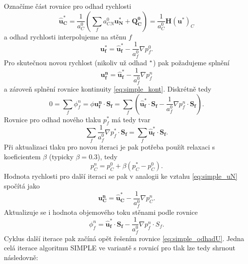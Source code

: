 Označíme část rovnice pro odhad rychlosti
\begin{equation}
\mathbf{\widehat{u}^*_C}= \dfrac{1}{a_C^0} (\sum_f a_{CN}^0 \mathbf{u_N^*}+\mathbf{Q_C^0}) =\dfrac{1}{a_C^0} \mathbf{H}(\mathbf{u^*})_C
\end{equation}
a odhad rychlosti interpolujeme na stěnu $ f $
\begin{equation}
 \mathbf{u_f^*}=\mathbf{\widehat{u}^*_f}-\dfrac{1}{a_f^0}\nabla p_f^0.
\end{equation}
Pro skutečnou novou rychlost (nikoliv už odhad $ \null^* $) pak požadujeme splnění
\begin{equation}\label{eq:simple_uN}
\mathbf{u_f^n}=\mathbf{\widehat{u}^*_f}-\dfrac{1}{a_f^0}\nabla p_f^n
\end{equation}
a zároveň splnění rovnice kontinuity \ref{eq:simple_kont}. Diskrétně tedy
\begin{equation}
0=\sum_f \phi_f^n = \phi \mathbf{u_f^n}\cdot \mathbf{S_f}
=
\sum_f \left(\mathbf{\widehat{u}^*_f}\cdot \mathbf{S_f}-\dfrac{1}{a_f^0}\nabla p_f^n\cdot \mathbf{S_f}\right).
\end{equation}
Rovnice pro odhad nového tlaku $ p_f^* $ má tedy tvar
\begin{equation}
\sum_f\dfrac{1}{a_f^0}\nabla p_f^*\cdot \mathbf{S_f}
=\sum_f \mathbf{\widehat{u}^*_f}\cdot \mathbf{S_f}.
\end{equation}
Při aktualizaci tlaku pro novou iteraci je pak potřeba použít relaxaci s koeficientem $ \beta $ (typicky $ \beta=0.3 $\cite{furst2020mko2}), tedy 
\begin{equation}
p_C^n = p_C^0 + \beta (p_C^*-p_C^0).
\end{equation}
Hodnota rychlosti pro další iteraci se pak v analogii ke vztahu \ref{eq:simple_uN} spočítá jako
\begin{equation}
\mathbf{u_C^n}=\mathbf{\widehat{u}^*_C}-\dfrac{1}{a_f^0}\nabla p_C^n.
\end{equation}
Aktualizuje se i hodnota objemového toku stěnami podle rovnice 
\begin{equation}
\phi_f^n=\mathbf{\widehat{u}^*_f}\cdot \mathbf{S_f}-\dfrac{1}{a_f^0}\nabla p_f^n\cdot S_f.
\end{equation}
Cyklus další iterace pak začíná opět řešením rovnice \ref{eq:simple_odhadU}.
\newpage
Jedna celá iterace algoritmu SIMPLE ve variantě s rovnicí pro tlak lze tedy shrnout následovně:

